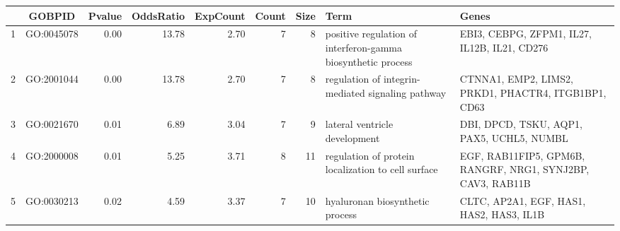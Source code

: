 \begin{table}[ht]
\centering
\begin{tabular}{l|c|r|r|r|r|r|p{3cm}|p{3cm}|}
  \hline
 & GOBPID & Pvalue & OddsRatio & ExpCount & Count & Size & Term & Genes \\ 
  \hline
1 & GO:0045078 & 0.00 & 13.78 & 2.70 &   7 &   8 & positive regulation of interferon-gamma biosynthetic process & EBI3, CEBPG, ZFPM1, IL27, IL12B, IL21, CD276 \\ 
  2 & GO:2001044 & 0.00 & 13.78 & 2.70 &   7 &   8 & regulation of integrin-mediated signaling pathway & CTNNA1, EMP2, LIMS2, PRKD1, PHACTR4, ITGB1BP1, CD63 \\ 
  3 & GO:0021670 & 0.01 & 6.89 & 3.04 &   7 &   9 & lateral ventricle development & DBI, DPCD, TSKU, AQP1, PAX5, UCHL5, NUMBL \\ 
  4 & GO:2000008 & 0.01 & 5.25 & 3.71 &   8 &  11 & regulation of protein localization to cell surface & EGF, RAB11FIP5, GPM6B, RANGRF, NRG1, SYNJ2BP, CAV3, RAB11B \\ 
  5 & GO:0030213 & 0.02 & 4.59 & 3.37 &   7 &  10 & hyaluronan biosynthetic process & CLTC, AP2A1, EGF, HAS1, HAS2, HAS3, IL1B \\ 
   \hline
\end{tabular}
\end{table}
